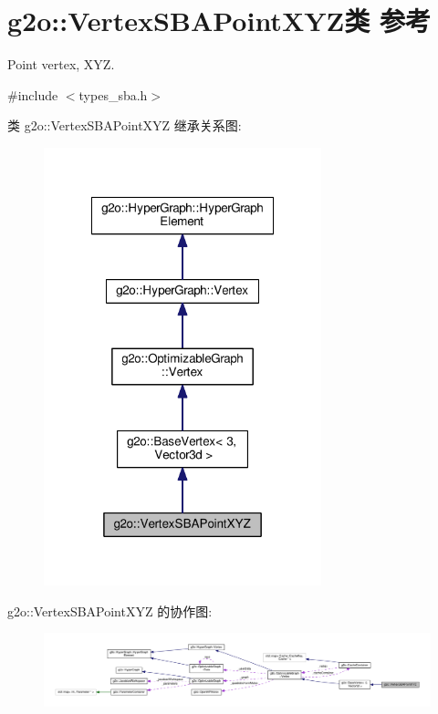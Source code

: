 \hypertarget{classg2o_1_1VertexSBAPointXYZ}{\section{g2o\-:\-:Vertex\-S\-B\-A\-Point\-X\-Y\-Z类 参考}
\label{classg2o_1_1VertexSBAPointXYZ}
}


Point vertex, X\-Y\-Z.  




{\ttfamily \#include $<$types\-\_\-sba.\-h$>$}



类 g2o\-:\-:Vertex\-S\-B\-A\-Point\-X\-Y\-Z 继承关系图\-:
\nopagebreak
\begin{figure}[H]
\begin{center}
\leavevmode
\includegraphics[width=228pt]{classg2o_1_1VertexSBAPointXYZ__inherit__graph}
\end{center}
\end{figure}


g2o\-:\-:Vertex\-S\-B\-A\-Point\-X\-Y\-Z 的协作图\-:
\nopagebreak
\begin{figure}[H]
\begin{center}
\leavevmode
\includegraphics[width=350pt]{classg2o_1_1VertexSBAPointXYZ__coll__graph}
\end{center}
\end{figure}
